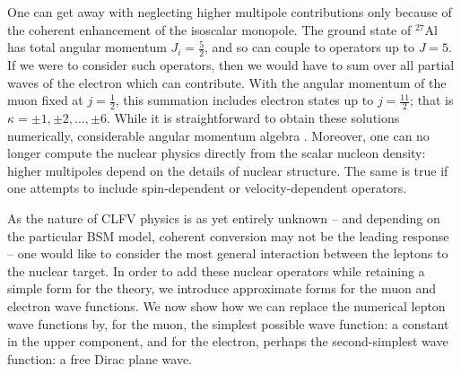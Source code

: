 \documentclass{book}[12pt]
\begin{document}


One can get away with neglecting higher multipole contributions only because of the coherent enhancement of the isoscalar monopole. The ground state of $^{27}$Al has total angular momentum $J_i=\frac{5}{2}$, and so can couple to operators up to $J=5$. If we were to consider such operators, then we would have to sum over all partial waves of the electron which can contribute. With the angular momentum of the muon fixed at $j=\frac{1}{2}$, this summation includes electron states up to $j=\frac{11}{2}$; that is $\kappa=\pm 1,\pm 2, ...,\pm 6$. While it is straightforward to obtain these solutions numerically, considerable angular momentum algebra . Moreover, one can no longer compute the nuclear physics directly from the scalar nucleon density: higher multipoles depend on the details of nuclear structure. The same is true if one attempts to include spin-dependent or velocity-dependent operators.

As the nature of CLFV physics is as yet entirely unknown -- and depending on the particular BSM model, coherent conversion may not be the leading response -- one would like to consider the most general interaction between the leptons to the nuclear target. In order to add these nuclear operators while retaining a simple form for the theory, we introduce approximate forms for the muon and electron wave functions. We now show how we can replace the numerical lepton wave functions by, for the muon, the simplest possible wave function: a constant in the upper component, and for the electron, perhaps the second-simplest wave function: a free Dirac plane wave.
\end{document}
